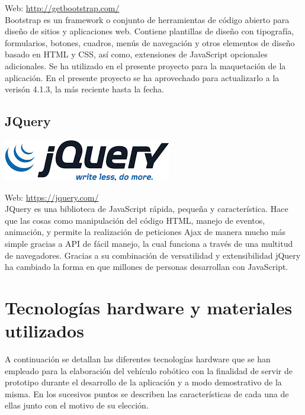 Web: \url{http://getbootstrap.com/}\\

Bootstrap es un framework o conjunto de herramientas de código abierto para diseño de sitios y aplicaciones web. Contiene plantillas de diseño con tipografía, formularios, botones, cuadros, menús de navegación y otros elementos de diseño basado en HTML y CSS, así como, extensiones de JavaScript opcionales adicionales.
Se ha utilizado en el presente proyecto para la maquetación de la aplicación. En el presente proyecto se ha aprovechado para actualizarlo a la verisón 4.1.3, la más reciente hasta la fecha.\\  

\subsection{JQuery}


\begin{center}
\includegraphics[scale=0.7]{imagenes/jquery-logo.png}
\end{center}

Web: \url{https://jquery.com/}\\

JQuery es una biblioteca de JavaScript rápida, pequeña y característica. Hace que las cosas como manipulación del código HTML, manejo de eventos, animación, y permite la realización de 
peticiones Ajax de manera mucho más simple gracias a API de fácil manejo, la cual funciona a través de una multitud de navegadores. Gracias a su combinación de versatilidad y extensibilidad jQuery
ha cambiado la forma en que millones de personas desarrollan con JavaScript.\\


\section{Tecnologías hardware y materiales utilizados}
\label{sec:tecnologias-hardware}

A continuación se detallan las diferentes tecnologías hardware que se han
empleado para la elaboración del vehículo robótico con la finalidad de servir de prototipo durante el desarrollo de la aplicación y a modo demostrativo de la misma. En los sucesivos puntos
se describen las características de cada una de ellas junto con el motivo de su elección.


